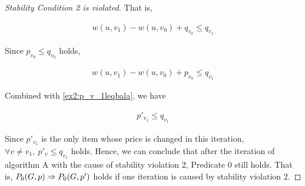 \documentclass[11pt,a4paper]{article}
\begin{document}
\begin{proof}[Stability Condition 2 is violated]
    That is, 

    \begin{align}
        w(u, v_1) - w(u, v_0) + q_{v_0} \leq q_{v_1}
    \end{align}

    Since $p_{v_0} \leq q_{v_0}$ holds,

    \begin{align}
        w(u, v_1) - w(u, v_0) + p_{v_0} \leq q_{v_1}
    \end{align}

    Combined with \eqref{ex2:p_v_1leqbala}, we have

    \begin{align}
        p'_{v_1} \leq q_{v_1}
    \end{align}

    Since $p'_{v_1}$ is the only item whose price is changed in this
    iteration, $\forall v \neq v_1,\ p'_{v} \leq q_{v_1}$ holds. Hence, we can
    conclude that after the iteration of algorithm A with the cause of
    stability violation 2, Predicate 0 still holds.
    That is, $ P_0(G, p) \Rightarrow P_0(G, p') $ holds if one iteration is
    caused by stability violation 2.

\end{proof}
\end{document}
